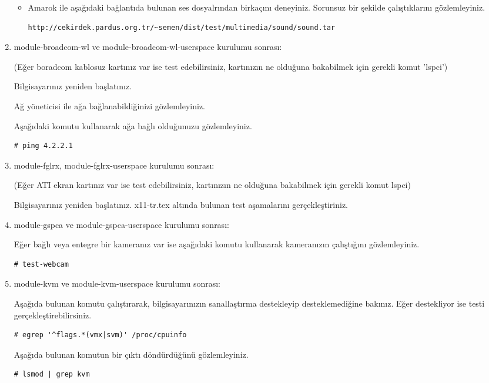 \documentclass[a4paper,10pt]{article}
\begin{document}
\begin{enumerate}
\begin{itemize}
\item Amarok ile aşağıdaki bağlantıda bulunan ses dosyalrından birkaçını deneyiniz. Sorunsuz bir şekilde çalıştıklarını gözlemleyiniz.
\begin{verbatim}
http://cekirdek.pardus.org.tr/~semen/dist/test/multimedia/sound/sound.tar 
\end{verbatim}

\end{itemize}

\item module-broadcom-wl ve module-broadcom-wl-userspace kurulumu sonrası: 

(Eğer boradcom kablosuz kartınız var ise test edebilirsiniz, kartınızın ne olduğuna bakabilmek için gerekli komut 'lspci')

Bilgisayarınız yeniden başlatınız.

Ağ yöneticisi ile ağa bağlanabildiğinizi gözlemleyiniz.

Aşağıdaki komutu kullanarak ağa bağlı olduğunuzu gözlemleyiniz.
\begin{verbatim}
# ping 4.2.2.1 
\end{verbatim}

\item module-fglrx, module-fglrx-userspace  kurulumu sonrası: 

(Eğer ATI ekran kartınız var ise test edebilirsiniz, kartınızın ne olduğuna bakabilmek için gerekli komut lspci)

Bilgisayarınız yeniden başlatınız. x11-tr.tex altında bulunan test aşamalarını gerçekleştiriniz.

\item module-gspca ve module-gspca-userspace kurulumu sonrası:

Eğer bağlı veya entegre bir kameranız var ise aşağıdaki komutu kullanarak kameranızın çalıştığını gözlemleyiniz.
\begin{verbatim}
# test-webcam
\end{verbatim}

\item module-kvm ve module-kvm-userspace kurulumu sonrası:

Aşağıda bulunan komutu çalıştırarak, bilgisayarınızın sanallaştırma destekleyip desteklemediğine bakınız. Eğer destekliyor ise testi gerçekleştirebilirsiniz. 
\begin{verbatim}
# egrep '^flags.*(vmx|svm)' /proc/cpuinfo
\end{verbatim}

Aşağıda bulunan komutun bir çıktı döndürdüğünü gözlemleyiniz.
\begin{verbatim}
# lsmod | grep kvm
\end{verbatim}


\end{enumerate}
\end{document}
